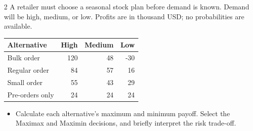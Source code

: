 \begin{multicols}{2}\raggedcolumns
{}
A retailer must choose a seasonal stock plan before demand is known. Demand will be high, medium, or low. Profits are in thousand USD; no probabilities are available.
\begin{center}\small\setlength{\tabcolsep}{4pt}
\begin{tabular}{@{}lrrr@{}}\toprule
Alternative&High&Medium&Low\\\midrule
Bulk order&120&48&-30\\
Regular order&84&57&16\\
Small order&55&43&29\\
Pre-orders only&24&24&24\\\bottomrule
\end{tabular}\end{center}
\begin{itemize}\item[\textbf{(C4)}] Calculate each alternative's maximum and minimum payoff. Select the Maximax and Maximin decisions, and briefly interpret the risk trade-off. \end{itemize}


\end{multicols}
